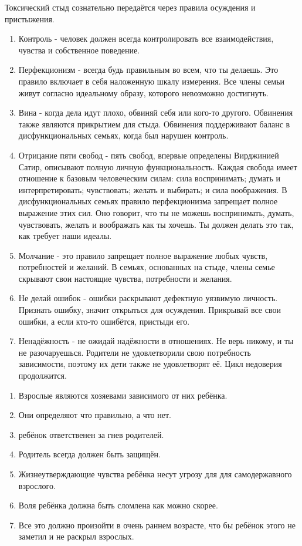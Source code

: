 \documentclass[10pt, fleqn]{article}
\begin{document}
Токсический стыд сознательно передаётся через правила осуждения и пристыжения.

\begin{enumerate}
\item Контроль - человек должен всегда контролировать все взаимодействия, чувства и собственное поведение.
\item Перфекционизм - всегда будь правильным во всем, что ты делаешь. Это правило включает в себя наложенную шкалу измерения. Все члены семьи живут согласно идеальному образу, которого невозможно достигнуть.
\item Вина - когда дела идут плохо, обвиняй себя или кого-то другого. Обвинения также являются прикрытием для стыда. Обвинения поддерживают баланс в дисфункциональных семьях, когда был нарушен контроль.
\item Отрицание пяти свобод - пять свобод, впервые определены Вирджинией Сатир, описывают полную личную функциональность. Каждая свобода имеет отношение к базовым человеческим силам: сила воспринимать; думать и интерпретировать; чувствовать; желать и выбирать; и сила воображения. В дисфункциональных семьях правило перфекционизма запрещает полное выражение этих сил. Оно говорит, что ты не можешь воспринимать, думать, чувствовать, желать и воображать как ты хочешь. Ты должен делать это так, как требует наши идеалы.
\item Молчание - это правило запрещает полное выражение любых чувств, потребностей и желаний. В семьях, основанных на стыде, члены семье скрывают свои настоящие чувства, потребности и желания.
\item Не делай ошибок - ошибки раскрывают дефектную уязвимую личность. Признать ошибку, значит открыться для осуждения. Прикрывай все свои ошибки, а если кто-то ошибётся, пристыди его.
\item Ненадёжность - не ожидай надёжности в отношениях. Не верь никому, и ты не разочаруешься. Родители не удовлетворили свою потребность зависимости, поэтому их дети также не удовлетворят её. Цикл недоверия продолжится.
\end{enumerate}

\begin{enumerate}
\item Взрослые являются хозяевами зависимого от них ребёнка.
\item Они определяют что правильно, а что нет.
\item ребёнок ответственен за гнев родителей.
\item Родитель всегда должен быть защищён.
\item Жизнеутверждающие чувства ребёнка несут угрозу для для самодержавного взрослого.
\item Воля ребёнка должна быть сломлена как можно скорее.
\item Все это должно произойти в очень раннем возрасте, что бы ребёнок этого не заметил и не раскрыл взрослых.
\end{enumerate}
\end{document}

